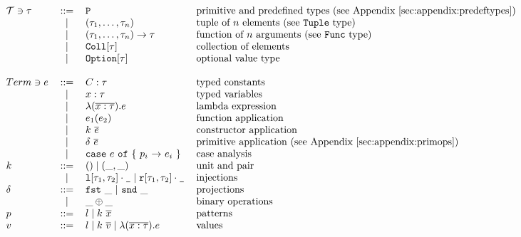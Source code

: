\[\begin{tabular}{@{}l c l l} 

$\mathcal{T} \ni \tau$	& ::= 	& \lst{P} 		& primitive and predefined types (see Appendix~\ref{sec:appendix:predeftypes}) \\

			    &	$\mid$	& $(\tau_1, \dots ,\tau_n) $			& tuple of $n$ elements (see \lst{Tuple} type)\\

			    &   $\mid$  & $(\tau_1, \dots ,\tau_n) \to \tau $	& function of $n$ arguments (see \lst{Func} type) \\
			    &   $\mid$  & $\text{\lst{Coll}}[\tau]$				& collection of elements      \\
			    &   $\mid$  & $\text{\lst{Option}}[\tau]$			& optional value type       \\
				& 	     	&										&				\\
$Term \ni e$	& ::= 		&   $C : \tau $							& typed constants  \\
				& 	$\mid$ 	& 	$x : \tau $ 						& typed variables  \\
				& 	$\mid$ 	& 	$\TyLam{x}{\tau}{e}$ 				& lambda expression \\
				& 	$\mid$ 	& 	$e_1(e_2)$ 							& function application \\
				& 	$\mid$ 	& 	$k~\Ov{e}$ 							& constructor application  \\
				& 	$\mid$ 	& 	$\delta~\Ov{e}$ 					& primitive application (see Appendix~\ref{sec:appendix:primops}) \\
				& 	$\mid$ 	& 	\lst{case} $e$ \lst{of} \{ $p_i$ $\rightarrow$ $e_i$  \}  & case analysis \\
$k$				& ::= 		&   $\Tup{} \mid \Tup{\_, \_}$ 			& unit and pair     	\\
				& 	$\mid$ 	&	$\Left{\tau_1}{\tau_2}{\text{\lst{\_}}} \mid \Right{\tau_1}{\tau_2}{\text{\lst{\_}}}$			& injections		\\
$\delta$		& ::= 		&   \Fst{\_} $\mid$ \Snd{\_}			& projections     	\\
				& 	$\mid$ 	&	$\_ \oplus \_$						& binary operations	\\
$p$				& ::= 		&   $l \mid k~\Ov{x}$ 			& patterns     	\\
$v$				& ::= 		&   $l \mid k~\Ov{v} \mid \TyLam{x}{\tau}{e}$ 		& values     	\\
 & & & \\
\end{tabular}\] 

